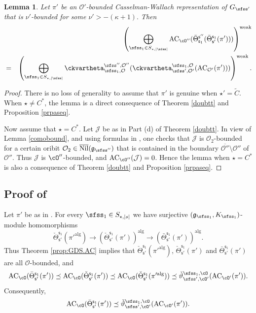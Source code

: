 \documentclass[11pt,a4paper]{amsart}
\def\abs#1{\left|{#1}\right|}
\newcommand{\CJ}{{\mathcal {J}}}
\newcommand{\CO}{{\mathcal {O}}}
\newcommand{\g}{\mathfrak g}
\newcommand{\be}{\begin {equation}}
\newcommand{\ee}{\end {equation}}
\numberwithin{equation}{section}
\newtheorem{lem}[thm]{Lemma}
\theoremstyle{remark}
\def\Nil{\overline{\mathrm{Nil}}}
\def\Thetab{\bar{\Theta}}
\begin{document}
\begin{lem}\label{lem:GDS.AC2}
  Let $\pi'$ be an $\CO'$-bounded Casselman-Wallach representation of $G_{\sfss'}$  that is  $\nu'$-bounded for some
$
  \nu'>
 -(\kappa+1).
$
Then
 \begin{eqnarray*}
  && \left( \bigoplus_{\sfss_1\in S_{\star, \abs{\sfss}} } \mathrm{AC}_{\cO''}( \Thetab^{\mathsf s''}_{\mathsf s_1}(\Thetab_{\mathsf s'}^{\mathsf s_1}(\pi')))\right)^{\mathrm{weak}}
\\
&=& \left( \bigoplus_{\sfss_1\in S_{\star, \abs{\sfss}}}   \ckvartheta^{\sfss'', \CO''}_{\sfss_1, \CO}(\ckvartheta^{\sfss_1, \CO}_{\sfss',\CO'}(\mathrm{AC}_{\CO'}(\pi')))\right)^{\mathrm{weak}}.
\end{eqnarray*}

\end{lem}

\begin{proof}
There is no loss of generality to assume that $\pi'$ is genuine when $\star'=\widetilde C$. When $\star\neq C^*$, the lemma is a direct consequence of Theorem \ref{doubtt} and Proposition \ref{prpaseq}.

Now assume that $\star=C^*$.  Let $\CJ$ be as in Part (d) of Theorem \ref{doubtt}. In view of Lemma \ref{comobound}, and using formulas in  \cite[Theorems 5.2 and 5.6]{DKPC}, one checks that $\CJ$ is $\CO_2$-bounded for a certain oribit $\CO_2\in \Nil(\g_{\sfss''})$ that is contained in the boundary $\overline{\CO''}\setminus \CO''$ of  $\CO''$. Thus
$\CJ$ is $\cO''$-bounded, and $ \mathrm{AC}_{\cO''}(\CJ)=0$. Hence  the  lemma when $\star=C^*$  is also a consequence of Theorem \ref{doubtt} and Proposition \ref{prpaseq}.
\end{proof}


\subsection{Proof of }
Let $\pi'$ be as in .
For every $\sfss_1\in S_{\star, \abs{s}}$ we have
surjective $(\g_{\sfss_1}, K_{\sfss_1})$-module homomorphisms
\[
\check \Theta_{\mathsf s'}^{\mathsf s_1}(\pi'^{\mathrm{alg}})\rightarrow \left (\check \Theta_{\mathsf s'}^{\mathsf s_1}(\pi')\right )^{\mathrm{alg}}\rightarrow
 \left (\Thetab_{\mathsf s'}^{\mathsf s_1}(\pi')\right )^{\mathrm{alg}}.
 \]
 Thus Theorem \ref{prop:GDS.AC} implies that  $\check \Theta_{\mathsf s'}^{\mathsf s_1}(\pi'^{\mathrm{alg}})$, $\check \Theta_{\mathsf s'}^{\mathsf s_1}(\pi')$ and $\Thetab_{\mathsf s'}^{\mathsf s_1}(\pi')$ are all $\CO$-bounded,  and
    \be\label{ineq000}
   \mathrm{AC}_{\cO}( \Thetab_{\mathsf s'}^{\mathsf s_1}(\pi'))\preceq  \mathrm{AC}_{\cO}(\check \Theta_{\mathsf s'}^{\mathsf s_1}(\pi'))\preceq  \mathrm{AC}_{\cO}(\check \Theta_{\mathsf s'}^{\mathsf s_1}(\pi'^{\mathrm{alg}}))\preceq \check \vartheta_{\sfss', \cO'}^{\sfss_1, \cO}(\mathrm{AC}_{\cO'}(\pi')).
  \ee
  Consequently,
   \be\label{acco}
   \mathrm{AC}_{\cO}( \Thetab_{\mathsf s'}^{\mathsf s_1}(\pi'))\preceq   \check \vartheta_{\sfss', \cO'}^{\sfss_1, \cO}(\mathrm{AC}_{\cO'}(\pi')).
  \ee
\end{document}
